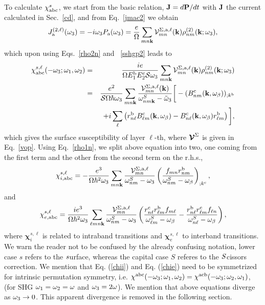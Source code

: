 \documentclass[floatfix,prb,aps,superscriptaddress,11pt,preprint]{revtex4}
\begin{document}
To calculate $\chi_{\mathrm{a}\mathrm{b}\mathrm{c}}^s$,
we start from the basic relation, $\mathbf{J}=d\mathbf{P}/dt$ 
with $\mathbf{J}$ the current calculated in Sec.~\ref{cd}, and
from Eq.~\eqref{jmac2} we obtain
\begin{equation}\label{Pjikn}
J_{\mathrm{a}}^{(2,\ell)}(\omega_3)=-i\omega_3P_{\mathrm{a}}(\omega_3)
=\frac{e}{\Omega}
\sum_{mn\mathbf{k}}
{\mathbf{\cal V}}^{\Sigma,\mathrm{a},\ell}_{mn}(\mathbf{k})
\rho^{(2)}_{nm}(\mathbf{k};\omega_3)
,
\end{equation}
which upon using Eqs.~\eqref{rho2n} and ~\eqref{sshgp2} leads to
\begin{eqnarray}\label{Pjikn2}
\chi^{s,\ell}_{\mathrm{a}\mathrm{b}\mathrm{c}}(-\omega_3;\omega_1,\omega_2)
&=&
\frac{ie}{\Omega E^{\mathrm{b}}_1E^{\mathrm{c}}_2{\cal S} \omega_3}
\sum_{mn\mathbf{k}}
{\mathbf{\cal V}}^{\Sigma,\mathrm{a},\ell}_{mn}(\mathbf{k})
\rho^{(2)}_{nm}(\mathbf{k};\omega_3)
\nonumber \\
&=&
\frac{e^2}{{\cal S}\Omega\hbar\omega_3}
\sum_{mn\mathbf{k}}
\frac{{\mathbf{\cal V}}^{\Sigma,\mathrm{a},\ell}_{mn}(\mathbf{k})}
{\omega^S_{nm\mathbf{k}}-\tilde\omega_3}
\bigg[
-(B_{nm}^{\mathrm{c}}(\mathbf{k},\omega_\beta))_{;k^{\mathrm{b}}}
\nonumber \\
&&
+i\sum_\ell\left(r_{n\ell}^{\mathrm{b}}B_{\ell m}^{\mathrm{c}}(\mathbf{k},\omega_\beta) -
  B_{n\ell}^{\mathrm{c}}(\mathbf{k},\omega_\beta) 
  r_{\ell m}^{\mathrm{b}}\right)
\bigg]
,
\end{eqnarray}
which gives the surface susceptibility of layer $\ell$-th, where 
$\boldsymbol{\mathcal{\cal V}}^\Sigma$ is given in Eq.~\eqref{vop}.
Using Eq.~\eqref{rho1n}, we
split above equation into
two, one coming from the first term and the other
from the second term on the r.h.s.,
\begin{equation}\label{chii}
\chi_{i,\mathrm{a}\mathrm{b}\mathrm{c}}^{s,\ell}=-\frac{e^3}{\Omega\hbar^2\omega_3}\sum_{mn\mathbf{k}}
\frac{{\mathbf{\cal V}}_{mn}^{\Sigma,\mathrm{a},\ell}}{\omega^S_{nm}-\omega_3}
\left(\frac{f_{mn}r_{nm}^{\mathrm{b}}}{\omega^S_{nm}-\omega_\beta}\right)_{;k^{\mathrm{c}}},
\end{equation} 
and
\begin{equation}\label{chie}
\chi_{e,\mathrm{a}\mathrm{b}\mathrm{c}}^{s,\ell}=\frac{ie^3}{\Omega\hbar^2\omega_3}\sum_{\ell mn\mathbf{k}}
\frac{{\mathbf{\cal V}}_{mn}^{\Sigma,\mathrm{a},\ell}}{\omega^S_{nm}-\omega_3}
\left(
\frac{r_{n\ell}^{\mathrm{c}} r_{\ell m}^{\mathrm{b}} 
f_{m\ell}}{\omega^S_{\ell m}-\omega_\beta}
-\frac{r_{n\ell}^{\mathrm{b}} r_{\ell m}^{\mathrm{c}} 
f_{\ell n}}{\omega^S_{n \ell}-\omega_\beta}
\right),
\end{equation} 
where $\boldsymbol{\chi}^{s,\ell}_i$
 is related to intraband transitions and
$\boldsymbol{\chi}^{s,\ell}_e$
to interband transitions. We warn the reader not to be confused by the
already confusing notation, lower case $s$ refers to the $\it
s$urface, whereas the capital case $S$ referes to the $\it S$cissors correction.   
We mention that
Eq. (\ref{chii}) and Eq. (\ref{chie}) need to be symmetrized for intrinsic
permutation symmetry, i.e.
$\chi^{\mathrm{a}\mathrm{b}\mathrm{c}}(-\omega_3;\omega_1,\omega_2)=\chi^{\mathrm{a}\mathrm{c}\mathrm{b}}(-\omega_3;\omega_2,\omega_1)$,\cite{rashkeev98}
(for SHG $\omega_1=\omega_2=\omega$ and $\omega_3=2\omega$). We mention that above
equations diverge as $\omega_3\to 0$. This apparent divergence is removed
in the following section.
\end{document}
